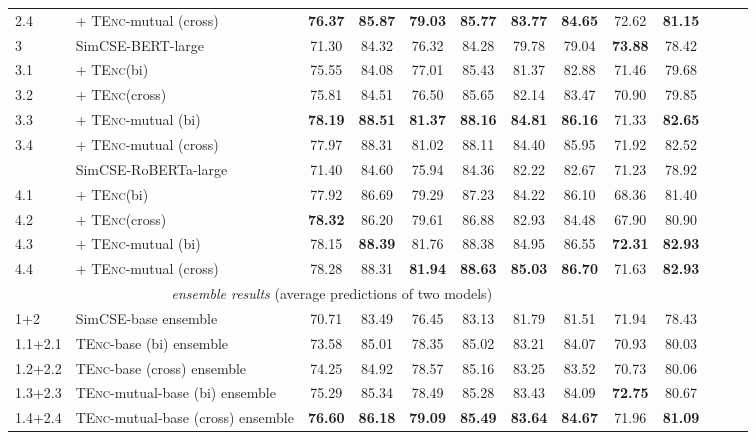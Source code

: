 \documentclass{article} \usepackage{iclr2021_conference,times}
\newcommand{\tenc}{\textsc{TEnc}\xspace}
\begin{document}
\begin{table}[!t]
\begin{tabular}{llccccccccccc}
2.4 & + \tenc-mutual (cross) & \textbf{76.37} & \textbf{85.87} & \textbf{79.03} & \textbf{85.77} & \textbf{83.77} & \textbf{84.65} & 72.62 & \textbf{81.15} \\
\cmidrule[.5pt]{1-10}
3 & SimCSE-BERT-large & 71.30 & 84.32 & 76.32 & 84.28 & 79.78 & 79.04 & \textbf{73.88} & 78.42 \\ 
3.1 & + \tenc (bi) & 75.55 & 84.08 & 77.01 & 85.43 & 81.37 & 82.88 & 71.46 & 79.68 \\
3.2 &+ \tenc (cross) & 75.81 & 84.51 & 76.50 & 85.65 & 82.14 & 83.47 & 70.90 & 79.85 \\
\rowcolor{red!5}
3.3 &+ \tenc-mutual (bi) & \textbf{78.19} & \textbf{88.51} & \textbf{81.37} & \textbf{88.16} & \textbf{84.81} & \textbf{86.16} & 71.33 & \textbf{82.65} \\
\rowcolor{red!5}
3.4 & + \tenc-mutual (cross) & 77.97 & 88.31 & 81.02 & 88.11 & 84.40 & 85.95 & 71.92 & 82.52 \\
\hdashline
4 & SimCSE-RoBERTa-large & 71.40 & 84.60 & 75.94 & 84.36 & 82.22 & 82.67 & 71.23 & 78.92 \\
4.1 & + \tenc (bi) & 77.92 & 86.69 & 79.29 & 87.23 & 84.22 & 86.10 & 68.36 & 81.40 \\
4.2 & + \tenc (cross) &  \textbf{78.32} & 86.20 & 79.61 & 86.88 & 82.93 & 84.48 & 67.90 & 80.90 \\
\rowcolor{red!5}
4.3 & + \tenc-mutual (bi) & 78.15 & \textbf{88.39} & 81.76 & 88.38 & 84.95 & 86.55 & \textbf{72.31} & \textbf{82.93}  \\
\rowcolor{red!5}
4.4 & + \tenc-mutual (cross) & 78.28 & 88.31 & \textbf{81.94} & \textbf{88.63} & \textbf{85.03} & \textbf{86.70} & 71.63 & \textbf{82.93} \\
\cmidrule[1.5pt]{1-10}
\multicolumn{9}{c}{\textit{ensemble results} (average predictions of two models)} \\
\cmidrule[1.0pt]{1-10}
1+2 & SimCSE-base ensemble & 70.71 & 83.49 & 76.45 & 83.13 & 81.79 & 81.51 & 71.94 & 78.43 \\
1.1+2.1 &\tenc-base (bi) ensemble & 73.58 & 85.01 & 78.35 & 85.02 & 83.21 & 84.07 & 70.93 & 80.03 \\
1.2+2.2 & \tenc-base (cross) ensemble &  74.25 & 84.92 & 78.57 & 85.16 & 83.25 & 83.52 & 70.73 & 80.06 \\
\rowcolor{blue!5}
1.3+2.3 & \tenc-mutual-base (bi) ensemble & 75.29 & 85.34 & 78.49 & 85.28 & 83.43 & 84.09 & \textbf{72.75} & 80.67\\
\rowcolor{blue!5}
1.4+2.4 & \tenc-mutual-base (cross) ensemble &  \textbf{76.60} & \textbf{86.18} & \textbf{79.09} & \textbf{85.49} & \textbf{83.64} & \textbf{84.67} & 71.96 & \textbf{81.09} \\

\end{tabular}
\end{table}
\end{document}

